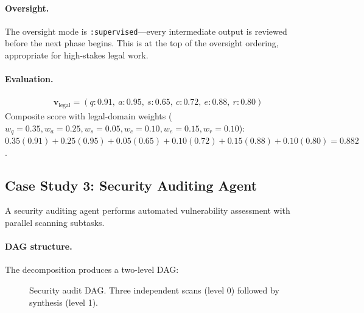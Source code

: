 \documentclass[12pt,a4paper]{article}
\theoremstyle{definition}
\theoremstyle{remark}
\begin{document}
\paragraph{Oversight.} The oversight mode is \texttt{:supervised}---every intermediate output is reviewed before the next phase begins. This is at the top of the oversight ordering, appropriate for high-stakes legal work.

\paragraph{Evaluation.}
\begin{align*}
  \mathbf{v}_{\text{legal}} = (q: 0.91,\ a: 0.95,\ s: 0.65,\ c: 0.72,\ e: 0.88,\ r: 0.80)
\end{align*}
Composite score with legal-domain weights ($w_q = 0.35, w_a = 0.25, w_s = 0.05, w_c = 0.10, w_e = 0.15, w_r = 0.10$): $0.35(0.91) + 0.25(0.95) + 0.05(0.65) + 0.10(0.72) + 0.15(0.88) + 0.10(0.80) = 0.882$.

\subsection{Case Study 3: Security Auditing Agent}

A security auditing agent performs automated vulnerability assessment with parallel scanning subtasks.

\paragraph{DAG structure.} The decomposition produces a two-level DAG:

\begin{figure}[H]
\centering
{}
\caption{Security audit DAG. Three independent scans (level 0) followed by synthesis (level 1).}\label{fig:security-dag}
\end{figure}
\end{document}
